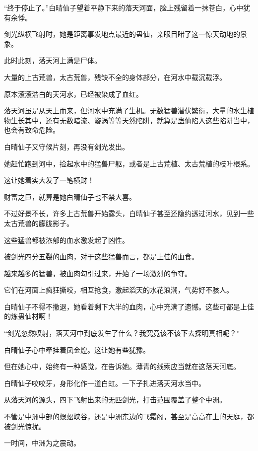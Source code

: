 
\begin{this_body}

“终于停止了。”白晴仙子望着平静下来的落天河面，脸上残留着一抹苍白，心中犹有余悸。

剑光纵横飞射时，她是距离事发地点最近的蛊仙，亲眼目睹了这一惊天动地的景象。

此时此刻，落天河上满是尸体。

大量的上古荒兽，太古荒兽，残缺不全的身体部分，在河水中载沉载浮。

原本滚滚浩白的天河水，已经被染成了血红。

落天河虽是从天上而来，但河水中充满了生机。无数猛兽潜伏繁衍，大量的水生植物生长其中，还有无数暗流、漩涡等等天然陷阱，就算是蛊仙陷入这些陷阱当中，也会有致命危险。

白晴仙子又守候片刻，再没有剑光发出。

她赶忙跑到河中，捡起水中的猛兽尸躯，或者是上古荒植、太古荒植的枝叶根系。

这让她着实大发了一笔横财！

财富之巨，就算是她白晴仙子也不禁大喜。

不过好景不长，许多上古荒兽开始露头，白晴仙子甚至还隐约透过河水，见到一些太古荒兽的朦胧影子。

这些猛兽都被浓郁的血水激发起了凶性。

被剑光四分五裂的血肉，对于这些猛兽而言，都是上佳的血食。

越来越多的猛兽，被血肉勾引过来，开始了一场激烈的争夺。

它们在河面上疯狂撕咬，相互抢食，激起滔天的水花浪潮，气势好不骇人。

白晴仙子不得不撤退，她看着剩下大半的血肉，心中充满了遗憾。这些可都是上佳的炼蛊仙材啊！

“剑光忽然喷射，落天河中到底发生了什么？我究竟该不该下去探明真相呢？”

白晴仙子心中牵挂着凤金煌。这让她有些犹豫。

但在她心中，始终有一种感觉，在告诉她。薄青的线索应当就在这落天河底。

白晴仙子咬咬牙，身形化作一道白虹。一下子扎进落天河水当中。

从落天河的源头，四下飞射出来的无匹剑光，打击范围覆盖了整个中洲。

不管是中洲中部的蜈蚣峡谷，还是中洲东边的飞霜阁，甚至是高高在上的天庭，都被剑光惊扰。

一时间，中洲为之震动。


\end{this_body}
